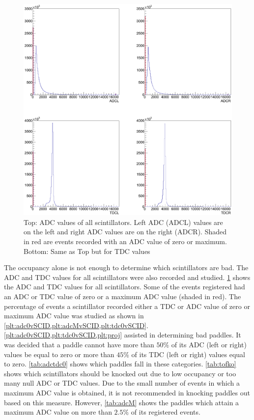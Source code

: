 \begin{figure}\begin{center}
    \includegraphics[width=0.70\linewidth]{figures/calib/tof/tofko/adctdcval.eps}
    \caption{\label{plt:adctdcval}Top: ADC values of all scintillators. Left ADC (ADCL) values are on the left and right ADC values are on the right (ADCR). Shaded in red are events recorded with an ADC value of zero or maximum. Bottom: Same as Top but for TDC values}
\end{center}\end{figure}

The occupancy alone is not enough to determine which scintillators are bad. The ADC and TDC values for all scintillators were also recorded and studied. \ref{plt:adctdcval} shows the ADC and TDC values for all scintillators. Some of the events registered had an ADC or TDC value of zero or a maximum ADC value (shaded in red). The percentage of events a scintillator recorded either a TDC or ADC value of zero or maximum ADC value was studied as shown in \ref{plt:adc0vSCID,plt:adcMvSCID,plt:tdc0vSCID}. \ref{plt:adc0vSCID,plt:tdc0vSCID,plt:proj} assisted in determining bad paddles. It was decided that a paddle cannot have more than $50\%$ of its ADC (left or right) values be equal to zero or more than $45\%$ of its TDC (left or right) values equal to zero. \ref{tab:adctdc0} shows which paddles fall in these categories. \ref{tab:tofko} shows which scintillators should be knocked out due to low occupancy or too many null ADC or TDC values. Due to the small number of events in which a maximum ADC value is obtained, it is not recommended in knocking paddles out based on this measure. However, \ref{tab:adcM} shows the paddles which attain a maximum ADC value on more than $2.5\%$ of its registered events.

